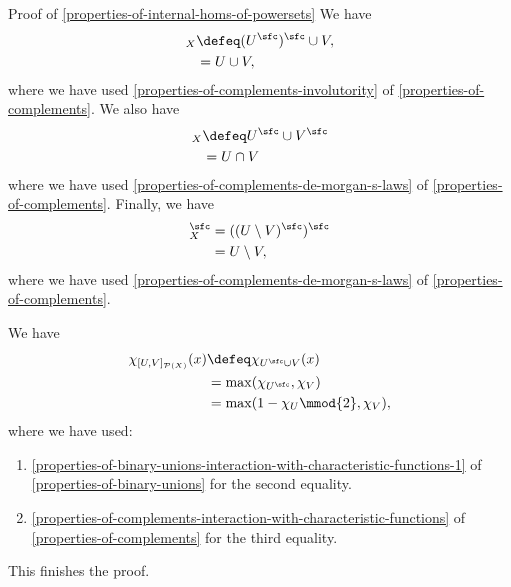 \begin{Proof}{Proof of \cref{properties-of-internal-homs-of-powersets}}
    We have
    \begin{align*}
        [U^{\sfc},V]_{X} &\defeq (U^{\sfc})^{\sfc}\cup V,\\
                         &=      U\cup V,
    \end{align*}
    where we have used \cref{properties-of-complements-involutority} of \cref{properties-of-complements}. We also have
    \begin{align*}
        [U,V^{\sfc}]_{X} &\defeq U^{\sfc}\cup V^{\sfc}\\
                         &=      U\cap V\\
    \end{align*}
    where we have used \cref{properties-of-complements-de-morgan-s-laws} of \cref{properties-of-complements}. Finally, we have
    \begin{align*}
        [U,V]^{\sfc}_{X} &= ((U\setminus V)^{\sfc})^{\sfc}\\
                         &= U\setminus V,
    \end{align*}
    where we have used \cref{properties-of-complements-de-morgan-s-laws} of \cref{properties-of-complements}.

    We have
    \begin{align*}
        \chi_{[U,V]_{\mathcal{P}(X)}}(x) &\defeq \chi_{U^{\sfc}\cup V}(x)\\
                                         &=      \max(\chi_{U^{\sfc}},\chi_{V})\\
                                         &=      \max(1-\chi_{U}\mmod{2},\chi_{V}),
    \end{align*}
    where we have used:
    \begin{enumerate}
        \item\label{proof-of-properties-of-internal-homs-of-powersets-interaction-with-characteristic-functions-1}\cref{properties-of-binary-unions-interaction-with-characteristic-functions-1} of \cref{properties-of-binary-unions} for the second equality.
        \item\label{proof-of-properties-of-internal-homs-of-powersets-interaction-with-characteristic-functions-2}\cref{properties-of-complements-interaction-with-characteristic-functions} of \cref{properties-of-complements} for the third equality.
    \end{enumerate}
    This finishes the proof.


\end{Proof}
